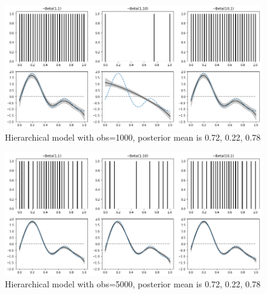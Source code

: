 \documentclass[11pt]{article}
\begin{document}
	\begin{figure} [h]
		\centering
		\includegraphics[width=1\linewidth]{output_36_1}
		\caption{Hierarchical model with obs=1000, posterior mean is 0.72, 0.22, 0.78}
		\label{fig:output351}
	\end{figure}
	\begin{figure} [h]
		\centering
		\includegraphics[width=1\linewidth]{output_37_1}
		\caption{Hierarchical model with obs=5000, posterior mean is 0.72, 0.22, 0.78}
		\label{fig:output351}
	\end{figure}
	
\end{document}
